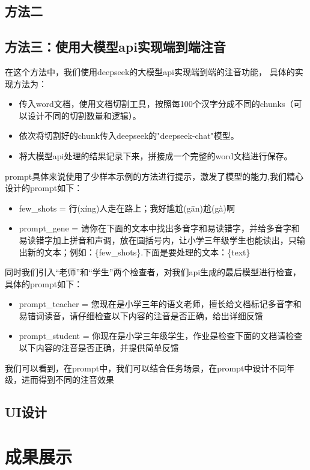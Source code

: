\documentclass[12pt,hyperref,a4paper,UTF8]{ctexart}
\begin{document}
\subsection{方法二}
\subsection{方法三：使用大模型api实现端到端注音}
在这个方法中，我们使用deepseek的大模型api实现端到端的注音功能，
具体的实现方法为：
\begin{itemize}
    \item 传入word文档，使用文档切割工具，按照每100个汉字分成不同的chunks（可以设计不同的切割数量和逻辑）。
    \item 依次将切割好的chunk传入deepseek的"deepseek-chat"模型。
    \item 将大模型api处理的结果记录下来，拼接成一个完整的word文档进行保存。
\end{itemize}
prompt具体来说使用了少样本示例的方法进行提示，激发了模型的能力,我们精心设计的prompt如下：
\begin{itemize}
    \item few\_shots = 行(xíng)人走在路上；我好尴尬(gān)尬(gà)啊
    \item prompt\_gene = 请你在下面的文本中找出多音字和易读错字，并给多音字和易读错字加上拼音和声调，放在圆括号内，让小学三年级学生也能读出，只输出新的文本；例如：\{few\_shots\}.下面是要处理的文本：\{text\}
\end{itemize}
同时我们引入“老师”和“学生”两个检查者，对我们api生成的最后模型进行检查，具体的prompt如下：
\begin{itemize}
    \item prompt\_teacher = 您现在是小学三年的语文老师，擅长给文档标记多音字和易错词读音，请仔细检查以下内容的注音是否正确，给出详细反馈
    \item prompt\_student = 你现在是小学三年级学生，作业是检查下面的文档请检查以下内容的注音是否正确，并提供简单反馈
\end{itemize}
我们可以看到，在prompt中，我们可以结合任务场景，在prompt中设计不同年级，进而得到不同的注音效果
\subsection{UI设计}

\section{成果展示}
\end{document}
